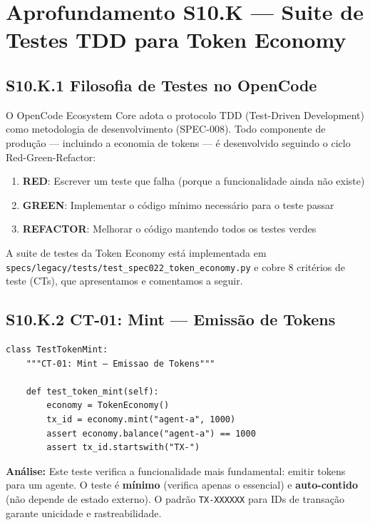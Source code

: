 \section*{Aprofundamento S10.K --- Suite de Testes TDD para Token Economy}

\subsection*{S10.K.1 Filosofia de Testes no OpenCode}

O OpenCode Ecosystem Core adota o protocolo TDD (Test-Driven Development) como metodologia de desenvolvimento (SPEC-008). Todo componente de produção --- incluindo a economia de tokens --- é desenvolvido seguindo o ciclo Red-Green-Refactor:

\begin{enumerate}
    \item \textbf{RED}: Escrever um teste que falha (porque a funcionalidade ainda não existe)
    \item \textbf{GREEN}: Implementar o código mínimo necessário para o teste passar
    \item \textbf{REFACTOR}: Melhorar o código mantendo todos os testes verdes
\end{enumerate}

A suite de testes da Token Economy está implementada em \texttt{specs/legacy/tests/test\_spec022\_token\_economy.py} e cobre 8 critérios de teste (CTs), que apresentamos e comentamos a seguir.

\subsection*{S10.K.2 CT-01: Mint --- Emissão de Tokens}

\begin{verbatim}
class TestTokenMint:
    """CT-01: Mint — Emissao de Tokens"""

    def test_token_mint(self):
        economy = TokenEconomy()
        tx_id = economy.mint("agent-a", 1000)
        assert economy.balance("agent-a") == 1000
        assert tx_id.startswith("TX-")
\end{verbatim}

\textbf{Análise:} Este teste verifica a funcionalidade mais fundamental: emitir tokens para um agente. O teste é \textbf{ mínimo} (verifica apenas o essencial) e \textbf{auto-contido} (não depende de estado externo). O padrão \texttt{TX-XXXXXX} para IDs de transação garante unicidade e rastreabilidade.


